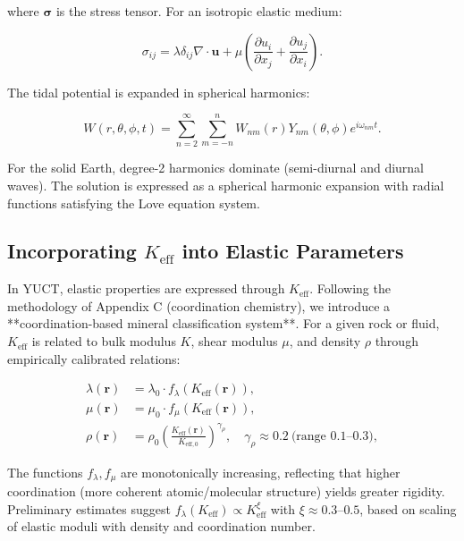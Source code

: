 \documentclass[12pt,a4paper]{article}
\theoremstyle{remark}
\newcommand{\Keff}{K_{\mathrm{eff}}}
\newcommand{\Keffzero}{K_{\mathrm{eff},0}}
\begin{document}
	where $\boldsymbol{\sigma}$ is the stress tensor. For an isotropic elastic medium:
	
	\begin{equation}
		\sigma_{ij} = \lambda \delta_{ij} \nabla \cdot \mathbf{u} + \mu \left(\frac{\partial u_i}{\partial x_j} + \frac{\partial u_j}{\partial x_i}\right).
		\label{eq:stress}
	\end{equation}
	
	The tidal potential is expanded in spherical harmonics:
	
	\begin{equation}
		W(r,\theta,\phi,t) = \sum_{n=2}^{\infty} \sum_{m=-n}^{n} W_{nm}(r) Y_{nm}(\theta,\phi) e^{i\omega_{nm}t}.
		\label{eq:tidal-potential}
	\end{equation}
	
	For the solid Earth, degree-2 harmonics dominate (semi-diurnal and diurnal waves). The solution is expressed as a spherical harmonic expansion with radial functions satisfying the Love equation system.
	
	\subsection{Incorporating $\Keff$ into Elastic Parameters}
	
	In YUCT, elastic properties are expressed through $\Keff$. Following the methodology of Appendix C (coordination chemistry), we introduce a **coordination-based mineral classification system**. For a given rock or fluid, $\Keff$ is related to bulk modulus $K$, shear modulus $\mu$, and density $\rho$ through empirically calibrated relations:
	
	\begin{align}
		\lambda(\mathbf{r}) &= \lambda_0 \cdot f_\lambda(\Keff(\mathbf{r})), \\
		\mu(\mathbf{r}) &= \mu_0 \cdot f_\mu(\Keff(\mathbf{r})), \\
		\rho(\mathbf{r}) &= \rho_0 \left(\frac{\Keff(\mathbf{r})}{\Keffzero}\right)^{\gamma_\rho}, \quad \gamma_\rho \approx 0.2\ \text{(range 0.1–0.3)},
		\label{eq:keff-properties}
	\end{align}
	
	The functions $f_\lambda, f_\mu$ are monotonically increasing, reflecting that higher coordination (more coherent atomic/molecular structure) yields greater rigidity. Preliminary estimates suggest $f_\lambda(\Keff) \propto \Keff^{\xi}$ with $\xi \approx 0.3$–$0.5$, based on scaling of elastic moduli with density and coordination number.
	
\end{document}
